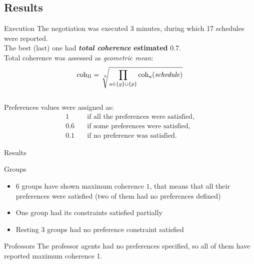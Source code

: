 \subsection{Results}

\begin{frame}{Execution}
  The negotiation was executed 3 minutes, during which 17 schedules were reported.
  \\\bigskip
  The best (last) one had \textbf{\emph{total coherence} estimated }$\mathbf{0.7}$.
  \\\bigskip
  Total coherence was assessed as \emph{geometric mean}:
  $$ \coh_\Pi = \sqrt[\leftroot{-2}\uproot{2}n]
                     {\prod\limits_{a \in \{g\} \cup \{p\}}
                           \coh_a (\mathit{schedule})
                     }
  $$
  \\\bigskip
  Preferences values were assigned as:
  \begin{align*}
    1   & \quad\text{if all the preferences were satisfied,} \\
    0.6 & \quad\text{if some preferences were satisfied,}    \\
    0.1 & \quad\text{if no preference was satisfied.}
  \end{align*}
\end{frame}

\begin{frame}{Results}
  \begin{block}{Groups}
    \begin{itemize}
      \item 6 groups have shown maximum coherence $1$,
            that means that all their preferences
            were satisfied (two of them had no preferences defined)
      \item One group had its constraints satisfied partially
      \item Resting 3 groups had no preference constraint satisfied
    \end{itemize}
  \end{block}
  \begin{block}{Professors}
    The professor agents had no preferences specified, so all of them have reported
    maximum coherence 1.
  \end{block}
\end{frame}

